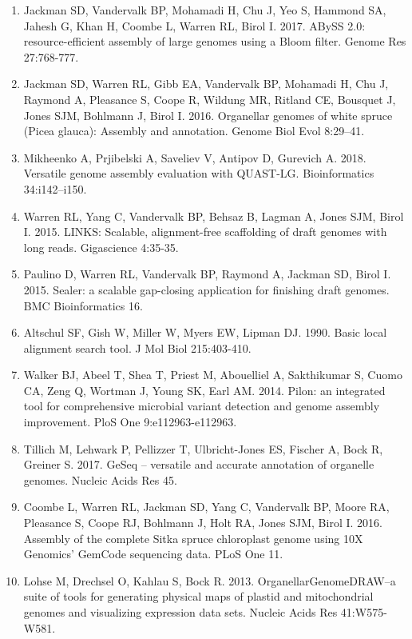 \documentclass[titlepage,11pt, oneside]{article}   	%
\begin{document}
\begin{enumerate}
\item Jackman SD, Vandervalk BP, Mohamadi H, Chu J, Yeo S, Hammond SA, Jahesh G, Khan H, Coombe L, Warren RL, Birol I. 2017. ABySS 2.0: resource-efficient assembly of large genomes using a Bloom filter. Genome Res 27:768-777.
\item Jackman SD, Warren RL, Gibb EA, Vandervalk BP, Mohamadi H, Chu J, Raymond A, Pleasance S, Coope R, Wildung MR, Ritland CE, Bousquet J, Jones SJM, Bohlmann J, Birol I. 2016. Organellar genomes of white spruce (Picea glauca): Assembly and annotation. Genome Biol Evol 8:29–41.
\item Mikheenko A, Prjibelski A, Saveliev V, Antipov D, Gurevich A. 2018. Versatile genome assembly evaluation with QUAST-LG. Bioinformatics 34:i142–i150.
\item Warren RL, Yang C, Vandervalk BP, Behsaz B, Lagman A, Jones SJM, Birol I. 2015. LINKS: Scalable, alignment-free scaffolding of draft genomes with long reads. Gigascience 4:35-35.
\item Paulino D, Warren RL, Vandervalk BP, Raymond A, Jackman SD, Birol I. 2015. Sealer: a scalable gap-closing application for finishing draft genomes. BMC Bioinformatics 16.
\item Altschul SF, Gish W, Miller W, Myers EW, Lipman DJ. 1990. Basic local alignment search tool. J Mol Biol 215:403-410.
\item Walker BJ, Abeel T, Shea T, Priest M, Abouelliel A, Sakthikumar S, Cuomo CA, Zeng Q, Wortman J, Young SK, Earl AM. 2014. Pilon: an integrated tool for comprehensive microbial variant detection and genome assembly improvement. PloS One 9:e112963-e112963.
\item Tillich M, Lehwark P, Pellizzer T, Ulbricht-Jones ES, Fischer A, Bock R, Greiner S. 2017. GeSeq – versatile and accurate annotation of organelle genomes. Nucleic Acids Res 45.
\item Coombe L, Warren RL, Jackman SD, Yang C, Vandervalk BP, Moore RA, Pleasance S, Coope RJ, Bohlmann J, Holt RA, Jones SJM, Birol I. 2016. Assembly of the complete Sitka spruce chloroplast genome using 10X Genomics’ GemCode sequencing data. PLoS One 11.
\item Lohse M, Drechsel O, Kahlau S, Bock R. 2013. OrganellarGenomeDRAW--a suite of tools for generating physical maps of plastid and mitochondrial genomes and visualizing expression data sets. Nucleic Acids Res 41:W575-W581.
\end{enumerate}
\end{document}

